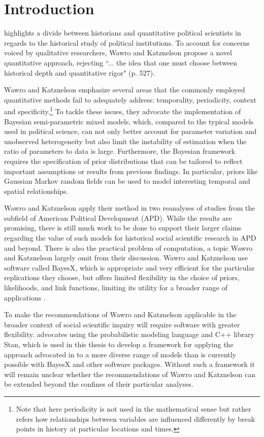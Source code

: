 \chapter{Introduction}
\label{introduction}

 highlights a divide between historians and quantitative political scientists in regards to the historical study of political institutions. To account for concerns voiced by qualitative researchers, Wawro and Katznelson propose a novel quantitative approach, rejecting ``... the idea that one must choose between historical depth and quantitative rigor" (p. 527).

Wawro and Katznelson emphasize several areas that the commonly employed quantitative methods fail to adequately address: temporality, periodicity, context and specificity.\footnote{Note that here periodicity is not used in the mathematical sense but rather refers how relationships between variables are influenced differently by break points in history at particular locations and times.}  To tackle these issues, they advocate the implementation of Bayesian semi-parametric mixed models, which, compared to the typical models used in political science, can not only better account for parameter variation and unobserved heterogeneity but also limit the instability of estimation when the ratio of parameters to data is large. Furthermore, the Bayesian framework requires the specification of prior distributions that can be tailored to reflect important assumptions or results from previous findings. In particular, priors like Gaussian Markov random fields can be used to model interesting temporal and spatial relationships. 

Wawro and Katznelson apply their method in two reanalyses of studies from the subfield of American Political Development (APD). While the results are promising, there is still much work to be done to support their larger claims regarding the value of such models for historical social scientific research in APD and beyond. There is also the practical problem of computation, a topic Wawro and Katznelson largely omit from their discussion. Wawro and Katznelson use software called BayesX, which is appropriate and very efficient for the particular replications they choose, but offers limited flexibility in the choice of priors, likelihoods, and link functions, limiting its utility for a broader range of applications . 

To make the recommendations of Wawro and Katznelson applicable in the broader context of social scientific inquiry will require software with greater flexibility.  advocates using the probabilistic modeling language and C++ library Stan, which is used in this thesis to develop a framework for applying the approach advocated in  to a more diverse range of models than is currently possible with BayesX and other software packages.  Without such a framework it will remain unclear whether the recommendations of Wawro and Katznelson can be extended beyond the confines of their particular analyses.  

